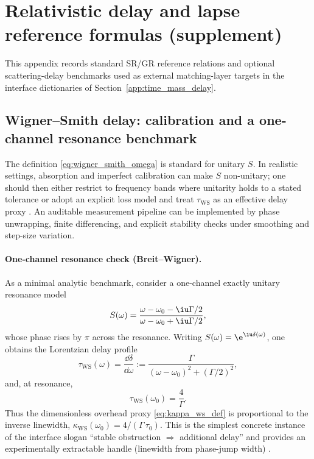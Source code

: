 \section{Relativistic delay and lapse reference formulas (supplement)}
\label{app:time_mass_delay_reference}

This appendix records standard SR/GR reference relations and optional scattering-delay benchmarks used as external matching-layer targets in the interface dictionaries of Section~\ref{app:time_mass_delay}.

\subsection{Wigner--Smith delay: calibration and a one-channel resonance benchmark}
\label{app:wigner_smith_reference}

\begin{remark}
\label{rem:wigner_smith_calibration_losses}
The definition \eqref{eq:wigner_smith_omega} is standard for unitary $S$.
In realistic settings, absorption and imperfect calibration can make $S$ non-unitary; one should then either restrict to frequency bands where unitarity holds to a stated tolerance or adopt an explicit loss model and treat $\tau_{\mathrm{WS}}$ as an effective delay proxy \cite{Wigner1955,Smith1960}.
An auditable measurement pipeline can be implemented by phase unwrapping, finite differencing, and explicit stability checks under smoothing and step-size variation.
\end{remark}

\paragraph{One-channel resonance check (Breit--Wigner).}
As a minimal analytic benchmark, consider a one-channel exactly unitary resonance model
\begin{equation}
\label{eq:breit_wigner_S_omega}
S(\omega)=\frac{\omega-\omega_0-\iu\Gamma/2}{\omega-\omega_0+\iu\Gamma/2},
\end{equation}
whose phase rises by $\pi$ across the resonance.
Writing $S(\omega)=\e^{\iu\delta(\omega)}$, one obtains the Lorentzian delay profile
\begin{equation}
\label{eq:breit_wigner_tau_omega}
\tau_{\mathrm{WS}}(\omega)=\frac{\dd\delta}{\dd\omega}
:=\frac{\Gamma}{(\omega-\omega_0)^2+(\Gamma/2)^2},
\end{equation}
and, at resonance,
\begin{equation}
\label{eq:tau_ws_peak}
\tau_{\mathrm{WS}}(\omega_0)=\frac{4}{\Gamma}.
\end{equation}
Thus the dimensionless overhead proxy \eqref{eq:kappa_ws_def} is proportional to the inverse linewidth, $\kappa_{\mathrm{WS}}(\omega_0)=4/(\Gamma\,\tau_0)$.
This is the simplest concrete instance of the interface slogan ``stable obstruction $\Rightarrow$ additional delay'' and provides an experimentally extractable handle (linewidth from phase-jump width) \cite{Wigner1955,Smith1960}.

